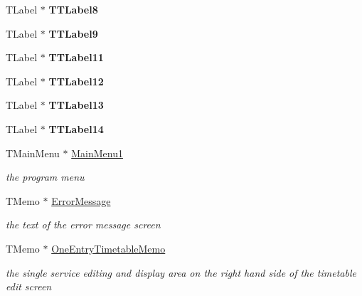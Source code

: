 \begin{DoxyCompactItemize}
T\+Label $\ast$ {\bfseries T\+T\+Label8}
\item 
\mbox{\label{class_t_interface_a9e6bc7213b1032b9edc9fb0557f591d6}} 
T\+Label $\ast$ {\bfseries T\+T\+Label9}
\item 
\mbox{\label{class_t_interface_af11b7241e105c4c478d562447864dafd}} 
T\+Label $\ast$ {\bfseries T\+T\+Label11}
\item 
\mbox{\label{class_t_interface_a0b58d81603e46751e570a920e2c638cd}} 
T\+Label $\ast$ {\bfseries T\+T\+Label12}
\item 
\mbox{\label{class_t_interface_ade4fe95a6c59702dc6c9d0c771bfdf93}} 
T\+Label $\ast$ {\bfseries T\+T\+Label13}
\item 
\mbox{\label{class_t_interface_af39e6390607a6576a23435b9059a0145}} 
T\+Label $\ast$ {\bfseries T\+T\+Label14}
\item 
\mbox{\label{class_t_interface_ac0defbc28edeb49db14e81c2084341cf}} 
T\+Main\+Menu $\ast$ \mbox{\hyperlink{class_t_interface_ac0defbc28edeb49db14e81c2084341cf}{Main\+Menu1}}
\begin{DoxyCompactList}\small\item\em the program menu \end{DoxyCompactList}\item 
\mbox{\label{class_t_interface_a119ec238c21ed011f11764d77c6c20b6}} 
T\+Memo $\ast$ \mbox{\hyperlink{class_t_interface_a119ec238c21ed011f11764d77c6c20b6}{Error\+Message}}
\begin{DoxyCompactList}\small\item\em the text of the error message screen \end{DoxyCompactList}\item 
\mbox{\label{class_t_interface_ad3adbf556bff0b01b12be33a595373fb}} 
T\+Memo $\ast$ \mbox{\hyperlink{class_t_interface_ad3adbf556bff0b01b12be33a595373fb}{One\+Entry\+Timetable\+Memo}}
\begin{DoxyCompactList}\small\item\em the single service editing and display area on the right hand side of the timetable edit screen \end{DoxyCompactList}\item 

\end{DoxyCompactItemize}
